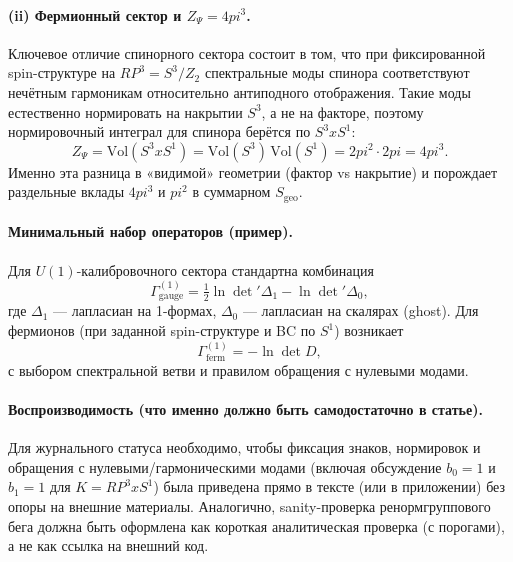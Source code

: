 \documentclass[12pt]{article}
\def\mathbb#1{#1}%
\def\pi{pi}%
\def\times{x}%
\begin{document}
\paragraph{(ii) Фермионный сектор и $Z_\Psi=4\pi^3$.}
Ключевое отличие спинорного сектора состоит в том, что при фиксированной spin-структуре на $\mathbb{RP}^3=S^3/\mathbb{Z}_2$ спектральные моды спинора соответствуют нечётным гармоникам относительно антиподного отображения.
Такие моды естественно нормировать на накрытии $S^3$, а не на факторе, поэтому нормировочный интеграл для спинора берётся по $S^3\times S^1$:
\begin{equation}
Z_\Psi=\mathrm{Vol}(S^3\times S^1)=\mathrm{Vol}(S^3)\,\mathrm{Vol}(S^1)=2\pi^2\cdot 2\pi=4\pi^3.
\end{equation}
Именно эта разница в «видимой» геометрии (фактор vs накрытие) и порождает раздельные вклады $4\pi^3$ и $\pi^2$ в суммарном $S_{\mathrm{geo}}$.



\paragraph{Минимальный набор операторов (пример).}
Для $U(1)$-калибровочного сектора стандартна комбинация
\begin{equation}
\Gamma^{(1)}_{\mathrm{gauge}}=\tfrac12\ln\det'\Delta_1-\ln\det'\Delta_0,
\end{equation}
где $\Delta_1$ --- лапласиан на 1-формах, $\Delta_0$ --- лапласиан на скалярах (ghost).
Для фермионов (при заданной spin-структуре и BC по $S^1$) возникает
\begin{equation}
\Gamma^{(1)}_{\mathrm{ferm}}=-\ln\det D,
\end{equation}
с выбором спектральной ветви и правилом обращения с нулевыми модами.

\paragraph{Воспроизводимость (что именно должно быть самодостаточно в статье).}
Для журнального статуса необходимо, чтобы фиксация знаков, нормировок и обращения с нулевыми/гармоническими модами (включая обсуждение $b_0=1$ и $b_1=1$ для $K=\mathbb{RP}^3\times S^1$) была приведена прямо в тексте (или в приложении) без опоры на внешние материалы.
Аналогично, sanity-проверка ренормгруппового бега должна быть оформлена как короткая аналитическая проверка (с порогами), а не как ссылка на внешний код.
\end{document}
